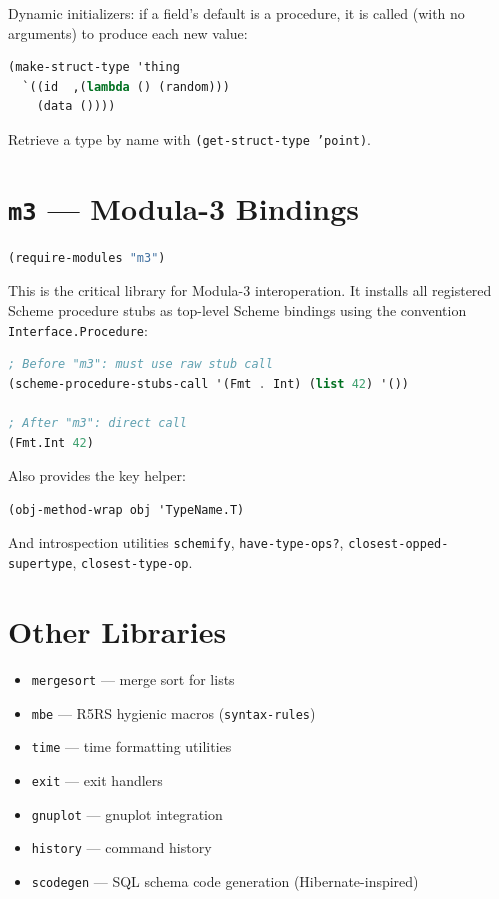 \documentclass[12pt]{report}
\begin{document}
Dynamic initializers: if a field's default is a procedure, it is called
(with no arguments) to produce each new value:

\begin{lstlisting}[language=Scheme]
(make-struct-type 'thing
  `((id  ,(lambda () (random)))
    (data ())))
\end{lstlisting}

Retrieve a type by name with {\tt (get-struct-type 'point)}.

\section{{\tt m3} --- Modula-3 Bindings}\label{sec:m3lib}

\begin{lstlisting}[language=Scheme]
(require-modules "m3")
\end{lstlisting}

This is the critical library for Modula-3 interoperation.  It installs
all registered Scheme procedure stubs as top-level Scheme bindings
using the convention {\tt Interface.Procedure}:

\begin{lstlisting}[language=Scheme]
; Before "m3": must use raw stub call
(scheme-procedure-stubs-call '(Fmt . Int) (list 42) '())

; After "m3": direct call
(Fmt.Int 42)
\end{lstlisting}

Also provides the key helper:
\begin{lstlisting}[language=Scheme]
(obj-method-wrap obj 'TypeName.T)
\end{lstlisting}

And introspection utilities {\tt schemify}, {\tt have-type-ops?},
{\tt closest-opped-supertype}, {\tt closest-type-op}.

\section{Other Libraries}

\begin{itemize}
\item {\tt mergesort} --- merge sort for lists
\item {\tt mbe} --- R5RS hygienic macros ({\tt syntax-rules})
\item {\tt time} --- time formatting utilities
\item {\tt exit} --- exit handlers
\item {\tt gnuplot} --- gnuplot integration
\item {\tt history} --- command history
\item {\tt scodegen} --- SQL schema code generation (Hibernate-inspired)
\end{itemize}
\end{document}
